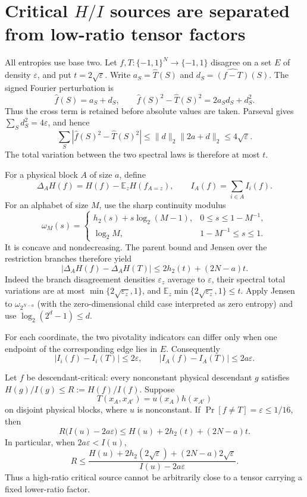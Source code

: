 \section*{Critical $H/I$ sources are separated from low-ratio tensor factors}

All entropies use base two.  Let
$f,T:\{-1,1\}^N\to\{-1,1\}$ disagree on a set $E$ of density
$\varepsilon$, and put $t=2\sqrt\varepsilon$.  Write
$a_S=\widehat T(S)$ and $d_S=\widehat{(f-T)}(S)$.  The signed Fourier
perturbation is
\[
 \widehat f(S)=a_S+d_S,
 \qquad
 \widehat f(S)^2-\widehat T(S)^2
 =2a_Sd_S+d_S^2.                                      \tag{1}
\]
Thus the cross term is retained before absolute values are taken.  Parseval
gives $\sum_Sd_S^2=4\varepsilon$, and hence
\[
 \sum_S\left|\widehat f(S)^2-\widehat T(S)^2\right|
 \le \|d\|_2\|2a+d\|_2\le4\sqrt\varepsilon.          \tag{2}
\]
The total variation between the two spectral laws is therefore at most $t$.

For a physical block $A$ of size $a$, define
\[
 \Delta_AH(f)=H(f)-\mathbb E_zH(f_{A=z}),\qquad
 I_A(f)=\sum_{i\in A}I_i(f).
\]
For an alphabet of size $M$, use the sharp continuity modulus
\[
 \omega_M(s)=
 \begin{cases}
 h_2(s)+s\log_2(M-1),&0\le s\le1-M^{-1},\\
 \log_2M,&1-M^{-1}\le s\le1.
 \end{cases}
\]
It is concave and nondecreasing.  The parent bound and Jensen over the
restriction branches therefore yield
\[
 |\Delta_AH(f)-\Delta_AH(T)|
 \le 2h_2(t)+(2N-a)t.                                  \tag{3}
\]
Indeed the branch disagreement densities $\varepsilon_z$ average to
$\varepsilon$, their spectral total variations are at most
$\min\{2\sqrt{\varepsilon_z},1\}$, and
$\mathbb E_z\min\{2\sqrt{\varepsilon_z},1\}\le t$.
Apply Jensen to $\omega_{2^{N-a}}$ (with the zero-dimensional child case
interpreted as zero entropy) and use $\log_2(2^d-1)\le d$.

For each coordinate, the two pivotality indicators can differ only when one
endpoint of the corresponding edge lies in $E$.  Consequently
\[
 |I_i(f)-I_i(T)|\le2\varepsilon,
 \qquad |I_A(f)-I_A(T)|\le2a\varepsilon.               \tag{4}
\]

\begin{theorem}
Let $f$ be descendant-critical: every nonconstant physical descendant $g$
satisfies $H(g)/I(g)\le R:=H(f)/I(f)$.  Suppose
\[
 T(x_A,x_{A^c})=u(x_A)h(x_{A^c})
\]
on disjoint physical blocks, where $u$ is nonconstant.  If
$\Pr[f\ne T]=\varepsilon\le1/16$, then
\[
 \boxed{
 R\bigl(I(u)-2a\varepsilon\bigr)
 \le H(u)+2h_2(t)+(2N-a)t.}                            \tag{5}
\]
In particular, when $2a\varepsilon<I(u)$,
\[
 R\le
 \frac{H(u)+2h_2(2\sqrt\varepsilon)
 +(2N-a)2\sqrt\varepsilon}
 {I(u)-2a\varepsilon}.                                 \tag{6}
\]
Thus a high-ratio critical source cannot be arbitrarily close to a tensor
carrying a fixed lower-ratio factor.
\end{theorem}

